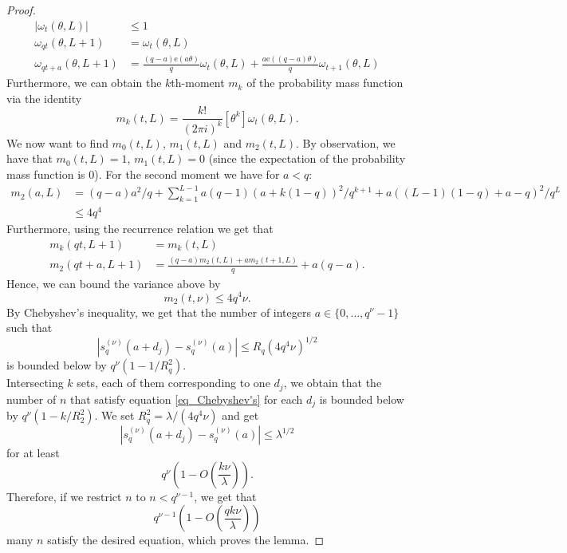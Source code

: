 \documentclass[12pt]{amsart}
\renewcommand{\leq}{\leqslant}
\theoremstyle{definition}
\numberwithin{equation}{section}
\newcommand\e{\mathrm{e}}
\numberwithin{equation}{section}
\begin{document}
\begin{proof}
\begin{align}
		|\omega_t(\theta,L)|&\leq 1\\
		\omega_{qt}(\theta,L+1)&=\omega_t(\theta,L)\\
		\omega_{qt+a}(\theta,L+1)&=\frac{(q-a)\e(a\theta)}{q}\omega_t(\theta,L)+\frac{a\e((q-a)\theta)}{q}\omega_{t+1}(\theta,L)
	\end{align}
	Furthermore, we can obtain the $k$th-moment $m_k$ of the probability mass function via the identity
	\begin{equation}
		m_k(t,L)=\frac{k!}{(2\pi i)^k}[\theta^k]\omega_t(\theta,L).
	\end{equation}
    We now want to find $m_0(t,L)$, $m_1(t,L)$ and $m_2(t,L)$. By observation, we have that $m_0(t,L)= 1$, $m_1(t,L)=0$ (since the expectation of the probability mass function is 0). For the second moment we have for $a<q$:
	\begin{align*}
		m_2(a,L)&=(q-a)a^2/q+\sum_{k=1}^{L-1}a(q-1)(a+k(1-q))^2/q^{k+1}+a((L-1)(1-q)+a-q)^2/q^L\\
		&\leq 4q^4
	\end{align*}
Furthermore, using the recurrence relation we get that
	\begin{align*}
		m_k(qt,L+1)&=m_k(t,L)\\
		m_2(qt+a,L+1)&=\frac{(q-a)m_2(t,L)+am_2(t+1,L)}{q}+a(q-a).
	\end{align*}
Hence, we can bound the variance above by
	\begin{equation}
		m_2(t,\nu)\leq 4q^4\nu.
	\end{equation}
	By Chebyshev's inequality, we get that the number of integers $a\in\{0,\dots,q^{\nu}-1\}$ such that
	\begin{equation}\label{eq_Chebyshev's}
		\left|s_{q}^{(\nu)}(a+d_j)-s_{q}^{(\nu)}(a)\right|\leq R_{q}(4q^4\nu)^{1/2}
	\end{equation}
	is bounded below by $q^{\nu}(1-1/R_q^2)$.\\
	Intersecting $k$ sets, each of them corresponding to one $d_j$, we obtain that the number of $n$ that satisfy equation \ref{eq_Chebyshev's} for each $d_j$ is bounded below by $ q^{\nu}(1-k/R_2^2)$. We set $R_q^2=\lambda/(4q^4\nu)$ and get
	\begin{equation}
		\left|s_{q}^{(\nu)}(a+d_j)-s_{q}^{(\nu)}(a)\right|\leq \lambda^{1/2}
	\end{equation}
	for at least
	\begin{equation}
		q^{\nu}\left(1-O\left(\frac{k\nu}{\lambda}\right)\right).
	\end{equation}
	Therefore, if we restrict $n$ to $n<q^{\nu-1}$, we get that
	\begin{equation}
		q^{\nu-1}\left(1-O\left(\frac{qk\nu}{\lambda}\right)\right)
	\end{equation}
	many $n$ satisfy the desired equation, which proves the lemma.
\end{proof}
\end{document}
